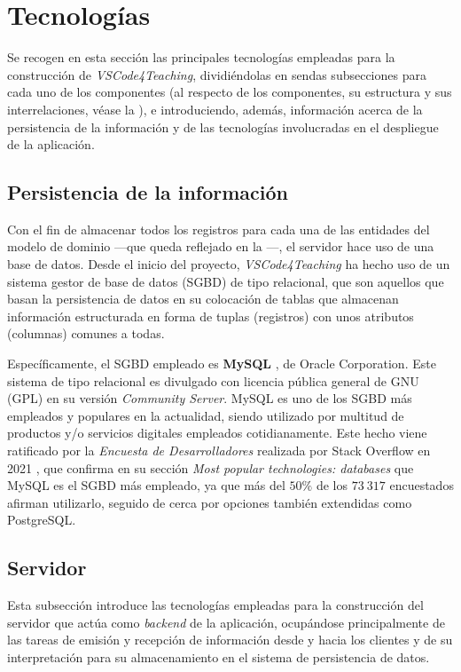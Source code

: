 \section{Tecnologías}
\label{sec:tecnologias}

Se recogen en esta sección las principales tecnologías empleadas para la construcción de \textit{VSCode4Teaching}, dividiéndolas en sendas subsecciones para cada uno de los componentes (al respecto de los componentes, su estructura y sus interrelaciones, véase la ), e introduciendo, además, información acerca de la persistencia de la información y de las tecnologías involucradas en el despliegue de la aplicación.

\subsection{Persistencia de la información}
Con el fin de almacenar todos los registros para cada una de las entidades del modelo de dominio ---que queda reflejado en la ---, el servidor hace uso de una base de datos.
Desde el inicio del proyecto, \textit{VSCode4Teaching} ha hecho uso de un sistema gestor de base de datos (SGBD) de tipo relacional, que son aquellos que basan la persistencia de datos en su colocación de tablas que almacenan información estructurada en forma de tuplas (registros) con unos atributos (columnas) comunes a todas.

Específicamente, el SGBD empleado es \textbf{MySQL} \cite{Tec_MySQL}, de Oracle Corporation. Este sistema de tipo relacional es divulgado con licencia pública general de GNU (GPL) en su versión \textit{Community Server}. MySQL es uno de los SGBD más empleados y populares en la actualidad, siendo utilizado por multitud de productos y/o servicios digitales empleados cotidianamente. Este hecho viene ratificado por la \textit{Encuesta de Desarrolladores} realizada por Stack Overflow en 2021 \cite{Tec_Encuesta_StackOverflow}, que confirma en su sección \textit{Most popular technologies: databases} que MySQL es el SGBD más empleado, ya que más del $50 \%$ de los $73\ 317$ encuestados afirman utilizarlo, seguido de cerca por opciones también extendidas como PostgreSQL.

\subsection{Servidor}
\label{subsec:tecServidor}
Esta subsección introduce las tecnologías empleadas para la construcción del servidor que actúa como \textit{backend} de la aplicación, ocupándose principalmente de las tareas de emisión y recepción de información desde y hacia los clientes y de su interpretación para su almacenamiento en el sistema de persistencia de datos.

